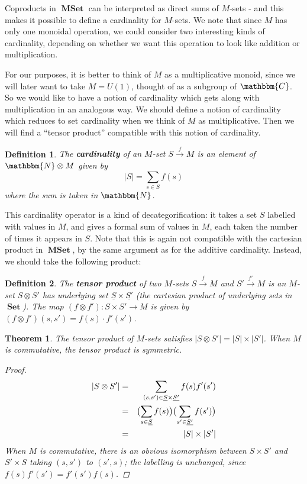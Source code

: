 \documentclass{amsart} \usepackage{amsmath,amssymb,bbm}
\newcommand{\opname}[1]{\operatorname{#1}}
\newtheorem{definition}{Definition}
\newcommand{\catname}[1]{\boldsymbol{\opname{{#1}}}}
\newtheorem{theorem}{Theorem}
\newcommand{\rightarrowlim}{\mathop{\rightarrow}\limits}
\begin{document}
Coproducts in $\catname{MSet}$ can be interpreted as direct sums of
$M$-sets - and this makes it possible to define a cardinality for
$M$-sets.  We note that since $M$ has only one monoidal
operation, we could consider two interesting kinds of cardinality,
depending on whether we want this operation to look like addition or
multiplication.

For our purposes, it is better to think of $M$ as a
multiplicative monoid, since we will later want to take $M=U(1)$,
thought of as a subgroup of $\mathbbm{C}$.  So we would like to have a
notion of cardinality which gets along with multiplication in an
analogous way.  We should define a notion of cardinality
which reduces to set cardinality when we think of $M$ as
multiplicative.  Then we will find a ``tensor product'' compatible
with this notion of cardinality.

\begin{definition} The \textbf{cardinality} of an $M$-set $S
\rightarrowlim^{f} M$ is an element of $\mathbbm{N} \otimes M$ given
by
\begin{equation}
|S| = \sum_{s \in S} f(s)
\end{equation}
where the sum is taken in $\mathbbm{N}$.
\end{definition}

This cardinality operator is a kind of decategorification: it takes a
set $S$ labelled with values in $M$, and gives a formal sum of values
in $M$, each taken the number of times it appears in $S$.  Note that
this is again not compatible with the cartesian product in
$\catname{MSet}$, by the same argument as for the additive
cardinality.  Instead, we should take the following product:

\begin{definition} The \textbf{tensor product} of two $M$-sets $S
\rightarrowlim^{f} M$ and $S' \rightarrowlim^{f'} M$ is an $M$-set $S
\otimes S'$ has underlying set $\underline{S} \times \underline{S'}$
(the cartesian product of underlying sets in $\catname{Set}$).  The
map $(f \otimes f'): S \times S' \rightarrow M$ is given by $(f
\otimes f')(s,s') = f(s)\cdot f'(s')$.
\end{definition}

\begin{theorem} The tensor product of $M$-sets satisfies $|S \otimes
S'| = |S| \times |S'|$.  When $M$ is commutative, the tensor product
is symmetric.
  \begin{proof}
  \begin{eqnarray}
    |S \otimes S'| & = & \sum_{(s,s')\in \underline{S} \times \underline{S'}} f(s)f'(s') \\
   \nonumber & = & \bigl{(}\sum_{s \in \underline{S}} f(s) \bigr{)} \bigl{(} \sum_{s' \in \underline{S'}} f(s') \bigr{)}\\
   \nonumber & = & |S| \times |S'|
  \end{eqnarray} When $M$ is commutative, there is an obvious
  isomorphism between $S \times S'$ and $S' \times S$ taking $(s,s')$
  to $(s',s)$; the labelling is unchanged, since $f(s) f'(s') = f'(s')
  f(s)$.
  \end{proof}
\end{theorem}
\end{document}
